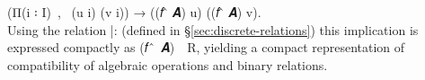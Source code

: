 (\af Π(\ab i \af ꞉ \ab I)~\af ,~ (\ab u \ab i) (\ab v \ab i)) \hskip2mm \as →  \hskip2mm  ((\ab 𝑓 \af ̂ \ab 𝑨) \ab u) ((\ab 𝑓 \af ̂ \ab 𝑨) \ab v).\\[4pt]
Using the relation |: (defined in \S\ref{sec:discrete-relations}) this implication is expressed compactly as (\ab 𝑓~\af ̂~\ab 𝑨)~\af{|:}~\ab R, yielding a compact representation of compatibility of algebraic operations and binary relations.
\ccpad
\begin{code}%
\>[0][@{}l@{\AgdaIndent{1}}]%
\>[1]\AgdaSpace{}%
\AgdaSymbol{:}\AgdaSpace{}%
\AgdaSymbol{(}\AgdaSpace{}%
\AgdaSymbol{:}\AgdaSpace{}%
\AgdaSpace{}%
\AgdaSpace{}%
\AgdaSymbol{)}\AgdaSpace{}%
\AgdaSpace{}%
\AgdaSpace{}%
\AgdaSpace{}%
\AgdaSpace{}%
\AgdaSpace{}%
\AgdaSpace{}%
\AgdaSpace{}%
\AgdaSpace{}%
\AgdaSpace{}%
\AgdaSpace{}%
\AgdaSpace{}%
\AgdaSpace{}%
\AgdaSpace{}%
\AgdaSpace{}%
\<%
\\
%
\>[1]%
\>[13]\AgdaSpace{}%
\AgdaSpace{}%
\AgdaSymbol{=}\AgdaSpace{}%
\AgdaSpace{}%
\AgdaSpace{}%
\AgdaSpace{}%
\AgdaSymbol{(}\AgdaSpace{}%
\AgdaSpace{}%
\AgdaSymbol{)}\AgdaSpace{}%
\AgdaFunction{|:}\AgdaSpace{}%
\<%
\end{code}
\scpad

